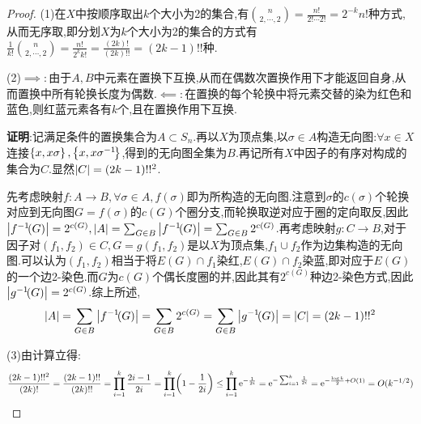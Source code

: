 \documentclass{article}
\begin{document}
\begin{proof}
    (1)在$X$中按顺序取出$k$个大小为2的集合,有$\binom{n}{2,\cdots,2}=\frac{n!}{2!\cdots 2!}=2^{-k}n!$种方式,从而无序取,即分划$X$为$k$个大小为2的集合的方式有$\frac{1}{k!}\binom{n}{2,\cdots,2}=\frac{n!}{2^k k!}=\frac{(2k)!}{(2k)!!}=(2k-1)!!$种.

    (2)$\implies:$由于$A,B$中元素在置换下互换,从而在偶数次置换作用下才能返回自身,从而置换中所有轮换长度为偶数.$\impliedby:$在置换的每个轮换中将元素交替的染为红色和蓝色,则红蓝元素各有$k$个,且在置换作用下互换.

    \textbf{证明}:记满足条件的置换集合为$A\subset S_n$.再以$X$为顶点集,以$\sigma\in A$构造无向图:$\forall x\in X$连接$\left\{x,x\sigma\right\},\left\{x,x\sigma^{-1}\!\right\}$,得到的无向图全集为$B$.再记所有$X$中因子的有序对构成的集合为$C$.显然$\left|C\right|=(2k-1)!!^2$.

    先考虑映射$f:A\to B,\forall \sigma\in A, f(\sigma)$即为所构造的无向图.注意到$\sigma$的$c(\sigma)$个轮换对应到无向图$G=f(\sigma)$的$c(G)$个圈分支,而轮换取逆对应于圈的定向取反,因此$\left|f^{-1}\!(G)\right|=2^{c(G)}, \left|A\right|=\sum_{G\in B}\left|f^{-1}\!(G)\right|=\sum_{G\in B}2^{c(G)}$.再考虑映射$g:C\to B$,对于因子对$(f_1,f_2)\in C, G=g(f_1,f_2)$是以$X$为顶点集,$f_1\cup f_2$作为边集构造的无向图.可以认为$(f_1,f_2)$相当于将$E(G)\cap f_1$染红,$E(G)\cap f_2$染蓝,即对应于$E(G)$的一个边2-染色.而$G$为$c(G)$个偶长度圈的并,因此其有$2^{c(G)}$种边2-染色方式,因此$\left|g^{-1}\!(G)\right|=2^{c(G)}$.综上所述,
    $$\left|A\right|=\sum_{G\in B}\left|f^{-1}\!(G)\right|=\sum_{G\in B}2^{c(G)}=\sum_{G\in B}\left|g^{-1}\!(G)\right|=\left|C\right|=(2k-1)!!^2$$

        

    (3)由计算立得:
    $$\frac{(2k-1)!!^2}{(2k)!}=\frac{(2k-1)!!}{(2k)!!}=\prod_{i=1}^k \frac{2i-1}{2i}=\prod_{i=1}^k \!\left(1-\frac{1}{2i}\right)\leq \prod_{i=1}^{k}\mathrm{e}^{-\frac{1}{2i}}=\mathrm{e}^{-\sum_{i=1}^k \frac{1}{2i}}=\mathrm{e}^{-\frac{\log k}{2}+O(1)}=O(k^{-1/2})$$
\end{proof}
\end{document}
